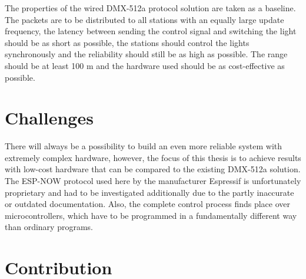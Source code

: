 The properties of the wired DMX-512a protocol solution are taken as a baseline.
The packets are to be distributed to all stations with an equally large update frequency,
the latency between sending the control signal and switching the light should be as short as possible,
the stations should control the lights synchronously and the reliability should still be as high as possible.
The range should be at least 100 m and the hardware used should be as cost-effective as possible.

\section*{Challenges}

There will always be a possibility to build an even more reliable system with extremely complex hardware,
however, the focus of this thesis is to achieve results with low-cost hardware that can be compared 
to the existing DMX-512a solution.
The ESP-NOW protocol used here by the manufacturer Espressif is unfortunately proprietary
and had to be investigated additionally due to the partly inaccurate or outdated documentation.
Also, the complete control process finds place over microcontrollers, 
which have to be programmed in a fundamentally different way than ordinary programs.

\section*{Contribution}

